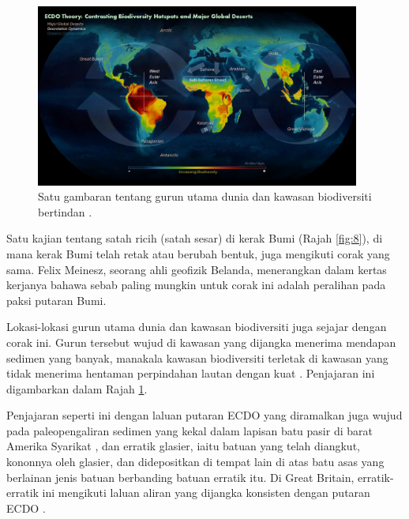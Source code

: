 \documentclass[10pt,twocolumn,letterpaper]{article}
\begin{document}
\begin{figure}[t]
\begin{center}
\includegraphics[width=0.95\textwidth]{biodiversity.jpg}
\end{center}
   \caption{Satu gambaran tentang gurun utama dunia dan kawasan biodiversiti bertindan \cite{28}.}
\label{fig:9}
\end{figure}

Satu kajian tentang satah ricih (satah sesar) di kerak Bumi (Rajah \ref{fig:8}), di mana kerak Bumi telah retak atau berubah bentuk, juga mengikuti corak yang sama. Felix Meinesz, seorang ahli geofizik Belanda, menerangkan dalam kertas kerjanya \cite{36} bahawa sebab paling mungkin untuk corak ini adalah peralihan pada paksi putaran Bumi.

Lokasi-lokasi gurun utama dunia dan kawasan biodiversiti juga sejajar dengan corak ini. Gurun tersebut wujud di kawasan yang dijangka menerima mendapan sedimen yang banyak, manakala kawasan biodiversiti terletak di kawasan yang tidak menerima hentaman perpindahan lautan dengan kuat \cite{28}. Penjajaran ini digambarkan dalam Rajah \ref{fig:9}.

Penjajaran seperti ini dengan laluan putaran ECDO yang diramalkan juga wujud pada paleopengaliran sedimen yang kekal dalam lapisan batu pasir di barat Amerika Syarikat \cite{21}, dan erratik glasier, iaitu batuan yang telah diangkut, kononnya oleh glasier, dan didepositkan di tempat lain di atas batu asas yang berlainan jenis batuan berbanding batuan erratik itu. Di Great Britain, erratik-erratik ini mengikuti laluan aliran yang dijangka konsisten dengan putaran ECDO \cite{67,68}.
\end{document}
